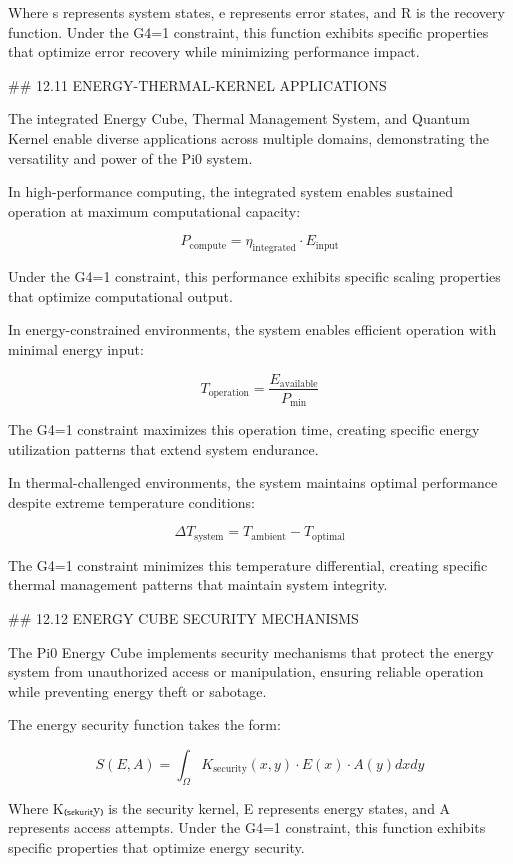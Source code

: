 Where s represents system states, e represents error states, and R is the recovery function. Under the G4=1 constraint, this function exhibits specific properties that optimize error recovery while minimizing performance impact.

## 12.11 ENERGY-THERMAL-KERNEL APPLICATIONS

The integrated Energy Cube, Thermal Management System, and Quantum Kernel enable diverse applications across multiple domains, demonstrating the versatility and power of the Pi0 system.

In high-performance computing, the integrated system enables sustained operation at maximum computational capacity:

$$P_{\text{compute}} = \eta_{\text{integrated}} \cdot E_{\text{input}}$$

Under the G4=1 constraint, this performance exhibits specific scaling properties that optimize computational output.

In energy-constrained environments, the system enables efficient operation with minimal energy input:

$$T_{\text{operation}} = \frac{E_{\text{available}}}{P_{\text{min}}}$$

The G4=1 constraint maximizes this operation time, creating specific energy utilization patterns that extend system endurance.

In thermal-challenged environments, the system maintains optimal performance despite extreme temperature conditions:

$$\Delta T_{\text{system}} = T_{\text{ambient}} - T_{\text{optimal}}$$

The G4=1 constraint minimizes this temperature differential, creating specific thermal management patterns that maintain system integrity.

## 12.12 ENERGY CUBE SECURITY MECHANISMS

The Pi0 Energy Cube implements security mechanisms that protect the energy system from unauthorized access or manipulation, ensuring reliable operation while preventing energy theft or sabotage.

The energy security function takes the form:

$$S(E, A) = \int_{\Omega} K_{\text{security}}(x, y) \cdot E(x) \cdot A(y) dx dy$$

Where K₍ₛₑₖᵤᵣᵢₜy₎ is the security kernel, E represents energy states, and A represents access attempts. Under the G4=1 constraint, this function exhibits specific properties that optimize energy security.

